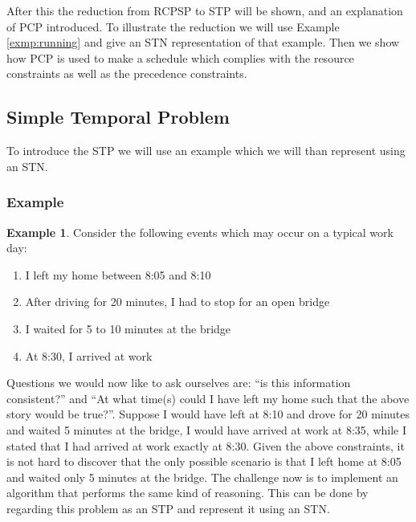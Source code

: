 \documentclass{article}
\theoremstyle{definition}
\newtheorem{example}{Example}[section]
\begin{document}
After this the reduction from RCPSP to STP will be shown, and an explanation of PCP introduced.
To illustrate the reduction we will use Example \ref{exmp:running} and give an STN representation of that example.
Then we show how PCP is used to make a schedule which complies with the resource constraints as well as the precedence constraints.

\subsection{Simple Temporal Problem}
\label{text:STN}
To introduce the STP we will use an example which we will than represent using an STN.

\subsubsection{Example}
\begin{example}
\label{exmp:stn}
Consider the following events which may occur on a typical work day:
\begin{enumerate}
\item I left my home between 8:05 and 8:10
\item After driving for 20 minutes, I had to stop for an open bridge
\item I waited for 5 to 10 minutes at the bridge
\item At 8:30, I arrived at work 
\end{enumerate}
\end{example}

Questions we would now like to ask ourselves are: ``is this information consistent?'' and ``At what time(s) could I have left my home such that the above story would be true?''. 
Suppose I would have left at 8:10 and drove for 20 minutes and waited 5 minutes at the bridge, I would have arrived at work at 8:35, while I stated that I had arrived at work exactly at 8:30. 
Given the above constraints, it is not hard to discover that the only possible scenario is that I left home at 8:05 and waited only 5 minutes at the bridge.
The challenge now is to implement an algorithm that performs the same kind of reasoning. 
This can be done by regarding this problem as an STP and represent it using an STN.
\end{document}
